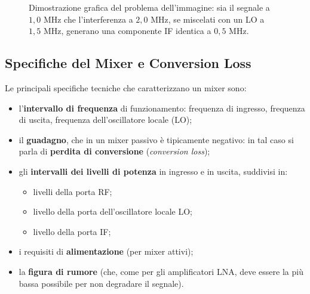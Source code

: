 \documentclass[openany,a4paper,12pt]{book}
\begin{document}
\begin{figure}[H]
{%
    }
    \caption*{Dimostrazione grafica del problema dell'immagine: sia il segnale a $1,0\text{ MHz}$ che l'interferenza a $2,0\text{ MHz}$, se miscelati con un LO a $1,5\text{ MHz}$, generano una componente IF identica a $0,5\text{ MHz}$.}
\end{figure}


\subsection*{Specifiche del Mixer e Conversion Loss}

Le principali specifiche tecniche che caratterizzano un mixer sono:
\begin{itemize}[label=\textcolor{PoliBlue}{\textbullet}]
    \item l'\textbf{intervallo di frequenza} di funzionamento: frequenza di ingresso, frequenza di uscita, frequenza dell'oscillatore locale (LO);
    \item il \textbf{guadagno}, che in un mixer passivo è tipicamente negativo: in tal caso si parla di \textbf{perdita di conversione} (\textit{conversion loss});
    \item gli \textbf{intervalli dei livelli di potenza} in ingresso e in uscita, suddivisi in:
    \begin{itemize}[label=\textcolor{ForestGreen}{$\circ$}]
        \item livelli della porta RF;
        \item livello della porta dell'oscillatore locale LO;
        \item livello della porta IF;
    \end{itemize}
    \item i requisiti di \textbf{alimentazione} (per mixer attivi);
    \item la \textbf{figura di rumore} (che, come per gli amplificatori LNA, deve essere la più bassa possibile per non degradare il segnale).
\end{itemize}
\end{document}
